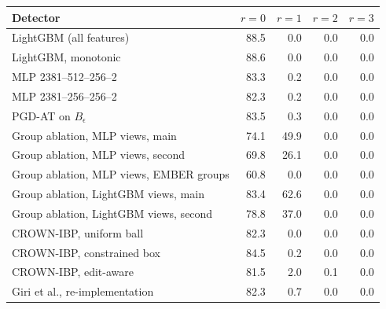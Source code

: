 \begin{tabular}{lrrrr}
\toprule
Detector & $r=0$ & $r=1$ & $r=2$ & $r=3$ \\
\midrule
LightGBM (all features) & 88.5 & 0.0 & 0.0 & 0.0 \\
LightGBM, monotonic & 88.6 & 0.0 & 0.0 & 0.0 \\
MLP 2381--512--256--2 & 83.3 & 0.2 & 0.0 & 0.0 \\
MLP 2381--256--256--2 & 82.3 & 0.2 & 0.0 & 0.0 \\
PGD-AT on $B_\epsilon$ & 83.5 & 0.3 & 0.0 & 0.0 \\
Group ablation, MLP views, main & 74.1 & 49.9 & 0.0 & 0.0 \\
Group ablation, MLP views, second & 69.8 & 26.1 & 0.0 & 0.0 \\
Group ablation, MLP views, EMBER groups & 60.8 & 0.0 & 0.0 & 0.0 \\
Group ablation, LightGBM views, main & 83.4 & 62.6 & 0.0 & 0.0 \\
Group ablation, LightGBM views, second & 78.8 & 37.0 & 0.0 & 0.0 \\
CROWN-IBP, uniform ball & 82.3 & 0.0 & 0.0 & 0.0 \\
CROWN-IBP, constrained box & 84.5 & 0.2 & 0.0 & 0.0 \\
CROWN-IBP, edit-aware & 81.5 & 2.0 & 0.1 & 0.0 \\
Giri et al., re-implementation & 82.3 & 0.7 & 0.0 & 0.0 \\
\bottomrule
\end{tabular}
